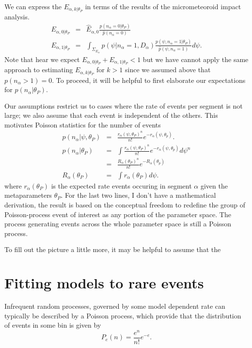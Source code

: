 \documentclass[twocolumn,showpacs,aps,prd,nobibnotes,nofootinbib,floatfix]{revtex4-1}
\begin{document}
We can express the $E_{\alpha,k|\theta_P}$ in terms of the results of the micrometeoroid impact analysis.
\begin{eqnarray}
  E_{\alpha,0|\theta_P}&=&
  \hat E_{\alpha,0}\frac{p(n_\alpha{=}0|\theta_P)}{\hat p(n_\alpha{=}0)}\\
  E_{\alpha,1|\theta_P}&=&
  \int_{\Sigma_{E_\alpha}}\hat p(\psi|n_\alpha{=}1,D_\alpha)
  \frac{p(\psi,n_\alpha{=}1|\theta_P)}{\hat p(\psi,n_\alpha{=}1)}d\psi.
\end{eqnarray}
Note that hear we expect $E_{\alpha,0|\theta_P}+E_{\alpha,1|\theta_P}<1$ but we have cannot apply the same approach to estimating $E_{\alpha,k|\theta_P}$ for $k>1$ since we assumed above that $p(n_\alpha{>}1)=0$.  To proceed, it will be helpful to first elaborate our expectations for $p(n_\alpha|\theta_P)$.

Our assumptions restrict us to cases where the rate of events per segment is not large; we also assume that each event is independent of the others. This motivates Poisson statistics for the number of events
\begin{eqnarray*}
  p(n_\alpha|\psi,\theta_P)&=&\frac{r_\alpha(\psi,\theta_P)^n}{n!}e^{-r_\alpha(\psi,\theta_p)}.\\
  p(n_\alpha|\theta_P)&=&\int\frac{r_\alpha(\psi,\theta_P)^n}{n!}e^{-r_\alpha(\psi,\theta_p)}d\psi^n\\
  &=&\frac{R_\alpha(\theta_P)^n}{n!}e^{-R_\alpha(\theta_p)}\\
  R_\alpha(\theta_P)&=&\int{r_\alpha(\theta_P)}d\psi.
\end{eqnarray*}
where $r_\alpha(\theta_P)$ is the expected rate events occuring in segment $\alpha$ given the metaparameters $\theta_P$.  For the last two lines, I don't have a mathematical derivation, the result is based on the conceptual freedom to redefine the group of Poisson-process event of interest as any portion of the parameter space.  The process generating events across the whole parameter space is still a Poisson process.

To fill out the picture a little more, it may be helpful to assume that the


\section{Fitting models to rare events}
Infrequent random processes, governed by some model dependent rate can typically be described by a Poisson process, which provide that the distribution of events in some bin is given by
\begin{equation}
  P_e(n)=\frac{e^n}{n!}e^{-e}.
\end{equation}
\end{document}
